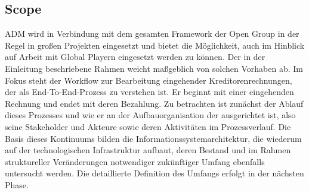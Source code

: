 \subsection{Scope}
ADM wird in Verbindung mit dem gesamten Framework der Open Group in der Regel in großen Projekten eingesetzt und bietet die Möglichkeit, auch im Hinblick auf Arbeit mit Global Playern eingesetzt werden zu können.
Der in der Einleitung beschriebene Rahmen weicht maßgeblich von solchen Vorhaben ab.
Im Fokus steht der Workflow zur Bearbeitung eingehender Kreditorenrechnungen, der als End-To-End-Prozess zu verstehen ist.
Er beginnt mit einer eingehenden Rechnung und endet mit deren Bezahlung.
Zu betrachten ist zunächst der Ablauf dieses Prozesses und wie er an der Aufbauorganisation der \firma ausgerichtet ist, also seine Stakeholder und Akteure sowie deren Aktivitäten im Prozessverlauf.
Die Basis dieses Kontinuums bilden die Informationssystemarchitektur, die wiederum auf der technologischen Infrastruktur aufbaut, deren Bestand und im Rahmen struktureller Veränderungen notwendiger zukünftiger Umfang ebenfalls untersucht werden.
Die detaillierte Definition des Umfangs erfolgt in der nächsten Phase.

